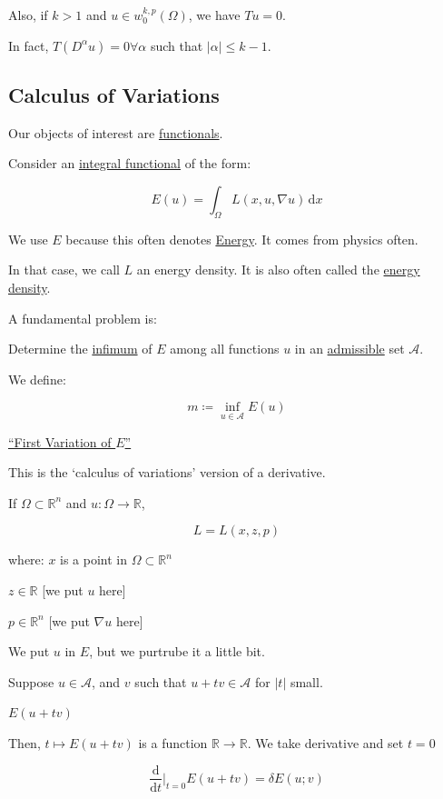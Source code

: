\documentclass{article}
\theoremstyle{definition}
\begin{document}
Also, if \(k > 1\) and \(u \in w_0^{k,p}(\Omega)\), we have \(T u = 0\). 

In fact, \(T(D^\alpha u) = 0 \forall \alpha\) such that \(\vert \alpha  \vert \leq k - 1\). 

\subsection*{Calculus of Variations}

Our objects of interest are \underline{functionals}.

Consider an \underline{integral functional} of the form:

\[
    E(u) = \int_{\Omega }^{} L(x, u, \nabla u) \,\mathrm{d}x
\]

We use \(E\) because this often denotes \underline{Energy}. It comes from physics often.

In that case, we call \(L\) an energy density. It is also often called the \underline{energy density}. 

A fundamental problem is:

Determine the \underline{infimum} of \(E\) among all functions \(u\) in an \underline{admissible} set \(\mathscr{A}\).

We define:

\[
    m \coloneqq \inf_{u\in \mathscr{A}} E(u)
\]

\underline{``First Variation of \(E\)''}

This is the `calculus of variations' version of a derivative.

If \(\Omega \subset \mathbb{R} ^n\) and \(u:\Omega \to \mathbb{R}\),

\[
    L = L(x,z,p)
\]

where: \(x\) is a point in \(\Omega \subset\mathbb{R}^n\) 

\(z\in\mathbb{R} \) [we put \(u\) here]

\(p\in\mathbb{R}^n\) [we put \(\nabla u\) here]

We put \(u\) in \(E\), but we purtrube it a little bit.

Suppose \(u \in \mathscr{A} \), and \(v\) such that \(u + tv \in \mathscr{A}\) for \(\vert t \vert \) small. 

\(E(u + tv)\)

Then, \(t \mapsto E(u+tv)\) is a function \(\mathbb{R} \to \mathbb{R}\). We take derivative and set \(t = 0\) 

\[
    \frac{\mathrm{d}}{\mathrm{d}t} \bigg\vert_{t=0} E(u + tv) = \delta E(u;v)
\]
\end{document}
